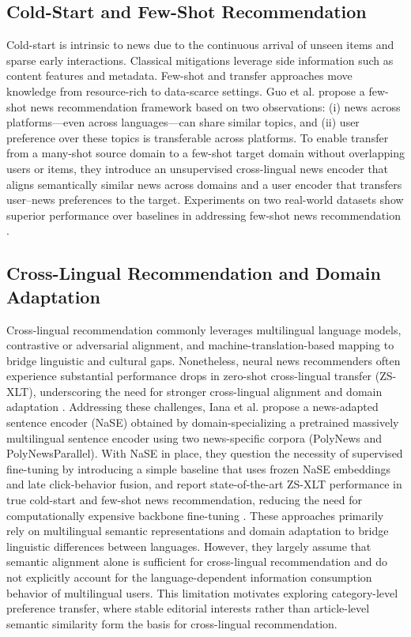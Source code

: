 \documentclass[conference]{IEEEtran}
\begin{document}
\subsection{Cold-Start and Few-Shot Recommendation} Cold-start is intrinsic to news due to the continuous arrival of unseen items and sparse early interactions. Classical mitigations leverage side information such as content features and metadata. Few-shot and transfer approaches move knowledge from resource-rich to data-scarce settings. Guo et al. propose a few-shot news recommendation framework based on two observations: (i) news across platforms—even across languages—can share similar topics, and (ii) user preference over these topics is transferable across platforms. To enable transfer from a many-shot source domain to a few-shot target domain without overlapping users or items, they introduce an unsupervised cross-lingual news encoder that aligns semantically similar news across domains and a user encoder that transfers user–news preferences to the target. Experiments on two real-world datasets show superior performance over baselines in addressing few-shot news recommendation \cite{10.1145/3543507.3583383}.

\subsection{Cross-Lingual Recommendation and Domain Adaptation} Cross-lingual recommendation commonly leverages multilingual language models, contrastive or adversarial alignment, and machine-translation-based mapping to bridge linguistic and cultural gaps. Nonetheless, neural news recommenders often experience substantial performance drops in zero-shot cross-lingual transfer (ZS-XLT), underscoring the need for stronger cross-lingual alignment and domain adaptation \cite{multilingualdataset}. Addressing these challenges, Iana et al. propose a news-adapted sentence encoder (NaSE) obtained by domain-specializing a pretrained massively multilingual sentence encoder using two news-specific corpora (PolyNews and PolyNewsParallel). With NaSE in place, they question the necessity of supervised fine-tuning by introducing a simple baseline that uses frozen NaSE embeddings and late click-behavior fusion, and report state-of-the-art ZS-XLT performance in true cold-start and few-shot news recommendation, reducing the need for computationally expensive backbone fine-tuning \cite{10.1007/978-3-031-88711-6_8}. These approaches primarily rely on multilingual semantic representations and domain adaptation to bridge linguistic differences between languages. However, they largely assume that semantic alignment alone is sufficient for cross-lingual recommendation and do not explicitly account for the language-dependent information consumption behavior of multilingual users. This limitation motivates exploring category-level preference transfer, where stable editorial interests rather than article-level semantic similarity form the basis for cross-lingual recommendation.
\end{document}
